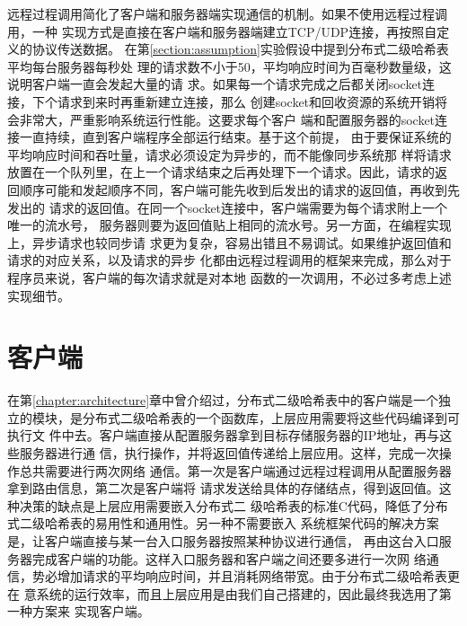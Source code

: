远程过程调用简化了客户端和服务器端实现通信的机制。如果不使用远程过程调用，一种
实现方式是直接在客户端和服务器端建立TCP/UDP连接，再按照自定义的协议传送数据。
在第\ref{section:assumption}实验假设中提到分布式二级哈希表平均每台服务器每秒处
理的请求数不小于50，平均响应时间为百毫秒数量级，这说明客户端一直会发起大量的请
求。如果每一个请求完成之后都关闭socket连接，下个请求到来时再重新建立连接，那么
创建socket和回收资源的系统开销将会非常大，严重影响系统运行性能。这要求每个客户
端和配置服务器的socket连接一直持续，直到客户端程序全部运行结束。基于这个前提，
由于要保证系统的平均响应时间和吞吐量，请求必须设定为异步的，而不能像同步系统那
样将请求放置在一个队列里，在上一个请求结束之后再处理下一个请求。因此，请求的返
回顺序可能和发起顺序不同，客户端可能先收到后发出的请求的返回值，再收到先发出的
请求的返回值。在同一个socket连接中，客户端需要为每个请求附上一个唯一的流水号，
服务器则要为返回值贴上相同的流水号。另一方面，在编程实现上，异步请求也较同步请
求更为复杂，容易出错且不易调试。如果维护返回值和请求的对应关系，以及请求的异步
化都由远程过程调用的框架来完成，那么对于程序员来说，客户端的每次请求就是对本地
函数的一次调用，不必过多考虑上述实现细节。

\section{客户端}\label{section:client}
在第\ref{chapter:architecture}章中曾介绍过，分布式二级哈希表中的客户端是一个独
立的模块，是分布式二级哈希表的一个函数库，上层应用需要将这些代码编译到可执行文
件中去。客户端直接从配置服务器拿到目标存储服务器的IP地址，再与这些服务器进行通
信，执行操作，并将返回值传递给上层应用。这样，完成一次操作总共需要进行两次网络
通信。第一次是客户端通过远程过程调用从配置服务器拿到路由信息，第二次是客户端将
请求发送给具体的存储结点，得到返回值。这种决策的缺点是上层应用需要嵌入分布式二
级哈希表的标准C代码，降低了分布式二级哈希表的易用性和通用性。另一种不需要嵌入
系统框架代码的解决方案是，让客户端直接与某一台入口服务器按照某种协议进行通信，
再由这台入口服务器完成客户端的功能。这样入口服务器和客户端之间还要多进行一次网
络通信，势必增加请求的平均响应时间，并且消耗网络带宽。由于分布式二级哈希表更在
意系统的运行效率，而且上层应用是由我们自己搭建的，因此最终我选用了第一种方案来
实现客户端。

